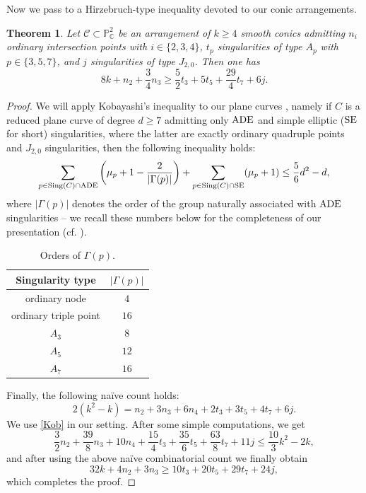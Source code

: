 \documentclass[11pt]{article}
\theoremstyle{plain}
\newtheorem{theorem}[thm]{Theorem}
\theoremstyle{definition}
\begin{document}
Now we pass to a Hirzebruch-type inequality devoted to our conic arrangements.
\begin{theorem}
\label{hirz}
Let $\mathcal{C} \subset \mathbb{P}^{2}_{\mathbb{C}}$ be an arrangement of $k\geq 4$ smooth conics admitting $n_{i}$ ordinary intersection points with $i \in \{2,3,4\}$, $t_{p}$ singularities of type $A_{p}$ with $p \in \{3,5,7\}$, and $j$ singularities of type $J_{2,0}$. Then one has
\begin{equation}
\label{hirze}
8k + n_{2} + \frac{3}{4}n_{3} \geq \frac{5}{2}t_{3} + 5t_{5} + \frac{29}{4}t_{7} + 6j.
\end{equation}
\end{theorem}
\begin{proof}
We will apply Kobayashi's inequality to our plane curves \cite{Kobayashi}, namely if $C$ is a reduced plane curve of degree $d \geq 7$ admitting only ${\rm ADE}$ and simple elliptic (${\rm SE}$ for short) singularities, where the latter are exactly ordinary quadruple points and $J_{2,0}$ singularities, then the following inequality holds:
\begin{equation}
\label{Kob}
\sum_{p \in {\rm Sing}(C) \cap {\rm ADE}} \bigg( \mu_{p}+1 - \frac{2}{|\Gamma(p)|}\bigg) + \sum_{p \in {\rm Sing}(C) \cap {\rm SE}}(\mu_{p}+1) \leq \frac{5}{6}d^{2}-d,
\end{equation}
where $|\Gamma(p)|$ denotes the order of the group naturally associated with ${\rm ADE}$ singularities -- we recall these numbers below for the completeness of our presentation (cf. \cite{Kobayashi}).

\begin{table}[h!]
    \centering
    \begin{tabular}{c|c}
     Singularity type & $|\Gamma(p)|$  \\ \hline
    ordinary node   & $4$  \\
    ordinary triple point & $16$ \\
    $A_{3}$ & $8$   \\
    $A_{5}$ & $12$   \\
    $A_{7}$ & $16$ 
    \end{tabular}
    \caption {Orders of $\Gamma(p)$.}
    \label{table: gammas}
\end{table}
\noindent
Finally, the following na\"ive count holds:
\begin{equation*}
2(k^{2}-k) = n_{2} + 3n_{3} + 6n_{4} + 2t_{3} + 3t_{5} + 4t_{7} + 6j.
\end{equation*}
We use \eqref{Kob} in our setting. After some simple computations, we get
$$\frac{3}{2}n_{2} + \frac{39}{8}n_{3} + 10n_{4} + \frac{15}{4}t_{3} + \frac{35}{6}t_{5} + \frac{63}{8}t_{7} + 11j \leq \frac{10}{3}k^{2}-2k,$$
and after using the above na\"ive combinatorial count we finally obtain
$$32k + 4n_{2} + 3n_{3} \geq 10t_{3} + 20t_{5} + 29t_{7} + 24j,$$
which completes the proof.
\end{proof}
\end{document}
